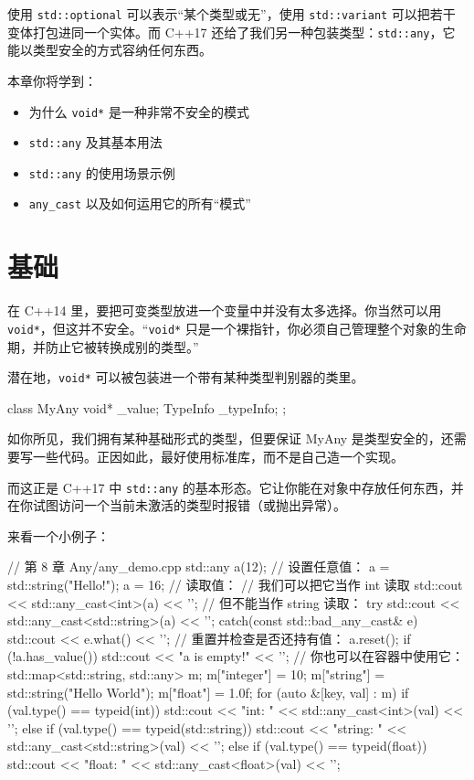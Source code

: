 使用 \texttt{std::optional} 可以表示“某个类型或无”，使用 \texttt{std::variant} 可以把若干变体打包进同一个实体。而 C++17 还给了我们另一种包装类型：\texttt{std::any}，它能以类型安全的方式容纳任何东西。

本章你将学到：
\begin{itemize}
\item 为什么 \texttt{void*} 是一种非常不安全的模式
\item \texttt{std::any} 及其基本用法
\item \texttt{std::any} 的使用场景示例
\item \texttt{any\_cast} 以及如何运用它的所有“模式”
\end{itemize}


\section{基础}

在 C++14 里，要把可变类型放进一个变量中并没有太多选择。你当然可以用 \texttt{void*}，但这并不安全。“\texttt{void*} 只是一个裸指针，你必须自己管理整个对象的生命期，并防止它被转换成别的类型。”

潜在地，\texttt{void*} 可以被包装进一个带有某种类型判别器的类里。

\begin{codebox}[cpp]
class MyAny
{
void* _value;
TypeInfo _typeInfo;
};
\end{codebox}

如你所见，我们拥有某种基础形式的类型，但要保证 MyAny 是类型安全的，还需要写一些代码。正因如此，最好使用标准库，而不是自己造一个实现。

而这正是 C++17 中 \texttt{std::any} 的基本形态。它让你能在对象中存放任何东西，并在你试图访问一个当前未激活的类型时报错（或抛出异常）。

来看一个小例子：

\begin{codebox}[cpp]
// 第 8 章 Any/any_demo.cpp
std::any a(12);
// 设置任意值：
a = std::string("Hello!");
a = 16;
// 读取值：
// 我们可以把它当作 int 读取
std::cout << std::any_cast<int>(a) << '\n';
// 但不能当作 string 读取：
try
{
std::cout << std::any_cast<std::string>(a) << '\n';
}
catch(const std::bad_any_cast& e)
{
std::cout << e.what() << '\n';
}
// 重置并检查是否还持有值：
a.reset();
if (!a.has_value())
{
std::cout << "a is empty!" << '\n';
}
// 你也可以在容器中使用它：
std::map<std::string, std::any> m;
m["integer"] = 10;
m["string"] = std::string("Hello World");
m["float"] = 1.0f;
for (auto &[key, val] : m)
{
if (val.type() == typeid(int))
std::cout << "int: " << std::any_cast<int>(val) << '\n';
else if (val.type() == typeid(std::string))
std::cout << "string: " << std::any_cast<std::string>(val) << '\n';
else if (val.type() == typeid(float))
std::cout << "float: " << std::any_cast<float>(val) << '\n';
}
\end{codebox}

